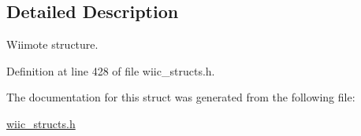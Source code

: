 \subsection{Detailed Description}
Wiimote structure. 

Definition at line 428 of file wiic\-\_\-structs.\-h.



The documentation for this struct was generated from the following file\-:\begin{DoxyCompactItemize}
\item 
\hyperlink{wiic__structs_8h}{wiic\-\_\-structs.\-h}\end{DoxyCompactItemize}
